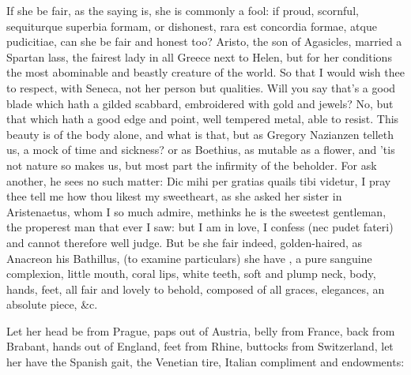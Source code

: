 {If she be fair, as the saying is, she is commonly a fool: if proud,
scornful, sequiturque superbia formam, or dishonest, rara est concordia
formae, atque pudicitiae, can she be fair and honest too? 
Aristo, the son of Agasicles, married a Spartan lass, the fairest lady
in all Greece next to Helen, but for her conditions the most abominable
and beastly creature of the world. So that I would wish thee to
respect, with Seneca, not her person but qualities. Will you say
that's a good blade which hath a gilded scabbard, embroidered with gold
and jewels? No, but that which hath a good edge and point, well
tempered metal, able to resist. This beauty is of the body alone, and
what is that, but as  Gregory Nazianzen telleth us, a mock of
time and sickness? or as Boethius, as mutable as a flower, and
'tis not nature so makes us, but most part the infirmity of the
beholder. For ask another, he sees no such matter: Dic mihi per gratias
quails tibi videtur, I pray thee tell me how thou likest my sweetheart,
as she asked her sister in Aristenaetus, whom I so much admire,
methinks he is the sweetest gentleman, the properest man that ever I
saw: but I am in love, I confess (nec pudet fateri) and cannot
therefore well judge. But be she fair indeed, golden-haired, as
Anacreon his Bathillus, (to examine particulars) she have
, a pure sanguine complexion,
little mouth, coral lips, white teeth, soft and plump neck, body,
hands, feet, all fair and lovely to behold, composed of all graces,
elegances, an absolute piece,
 \&c.

Let her head be from Prague, paps out of Austria, belly from
France, back from Brabant, hands out of England, feet from Rhine,
buttocks from Switzerland, let her have the Spanish gait, the Venetian
tire, Italian compliment and endowments:

}
